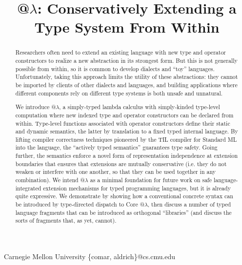 \documentclass[9pt,preprint]{sigplanconf}
\begin{document}
\conferenceinfo{-}{-} 
\copyrightyear{-} 
\copyrightdata{[to be supplied]} 


\title{@$\lambda$: Conservatively Extending a Type System From Within}

           {Carnegie Mellon University}
            {\{comar, aldrich\}@cs.cmu.edu}   

\maketitle
\begin{abstract}
Researchers often need to extend an existing language with new type and operator constructors to realize a new abstraction in its strongest form. 
But this is not generally possible from within, so it is common to develop dialects and ``toy'' languages.
Unfortunately, taking this approach limits the utility of these abstractions: they cannot be imported by clients of other dialects and languages, and building applications where different components rely on different type systems is both unsafe and unnatural. 

We introduce @$\lambda$, a simply-typed lambda calculus with simply-kinded type-level computation where new indexed type and operator constructors can be declared  from within. %
Type-level functions associated with operator constructors define their static and dynamic semantics, the latter by translation to a fixed typed internal language. By lifting compiler correctness techniques pioneered by the TIL compiler for Standard ML into the language, the ``actively typed semantics'' guarantees type safety. Going further, the semantics enforce a novel form of representation independence at extension boundaries that ensures that extensions are mutually conservative (i.e. they do not weaken or interfere with one another, so that they can  be used together in any combination). 
We intend @$\lambda$ as a minimal foundation for future work on safe language-integrated extension mechanisms for typed programming languages, but it is already quite expressive. We demonstrate by showing how a conventional concrete syntax can be introduced by type-directed dispatch to Core @$\lambda$, then discuss a number of typed language fragments that can be introduced as orthogonal ``libraries'' (and discuss the sorts of fragments that, as yet, cannot).
\end{abstract}
\end{document}
